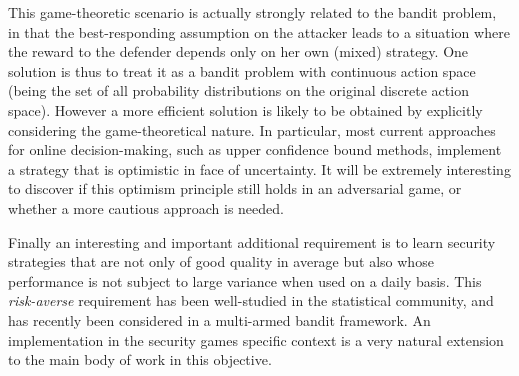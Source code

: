  This game-theoretic scenario is actually strongly related to the bandit problem, in that the best-responding assumption on the attacker leads to a situation where the reward to the defender depends only on her own (mixed) strategy.  One solution is thus to treat it as a bandit problem with continuous action space (being the set of all probability distributions on the original discrete action space).  However a more efficient solution is likely to be obtained by explicitly considering the game-theoretical nature.
%
In particular, most current approaches for online decision-making, such as upper confidence bound methods\cite{Auer02FA}, implement a strategy that is optimistic in face of uncertainty. It will be extremely interesting to discover if this optimism principle still holds in an adversarial game, or whether a more cautious approach is needed.

Finally an interesting and important additional requirement is to learn security strategies that are not only of good quality in average but also whose performance is not subject to large variance when used on a daily basis. This {\em risk-averse} requirement has been well-studied in the statistical community, %
and has recently been considered in a multi-armed bandit framework\cite{NIPS2012_4753}. An implementation in the security games specific context is a very natural extension to the main body of work in this objective.




